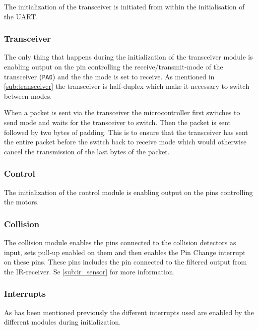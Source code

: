 \documentclass[a4paper,twoside,titlepage]{article}
\begin{document}
The initialization of the transceiver is initiated from within the initialisation of the UART.

\subsubsection{Transceiver} %
\label{ssub:transceiver}

The only thing that happens during the initialization of the transceiver module is enabling output on the pin controlling the receive/transmit-mode of the transceiver ({\tt PA0}) and the the mode is set to receive. As mentioned in \autoref{sub:transceiver} the transceiver is half-duplex which make it necessary to switch between modes.

When a packet is sent via the transceiver the microcontroller first switches to send mode and waits for the transceiver to switch. Then the packet is sent followed by two bytes of padding. This is to ensure that the transceiver has sent the entire packet before the switch back to receive mode which would otherwise cancel the transmission of the last bytes of the packet.

\subsubsection{Control} %
\label{ssub:control}

The initialization of the control module is enabling output on the pins controlling the motors.

\subsubsection{Collision} %
\label{ssub:collision}

The collision module enables the pins connected to the collision detectors as input, sets pull-up enabled on them and then enables the Pin Change interrupt on these pins. These pins includes the pin connected to the filtered output from the IR-receiver. Se \autoref{sub:ir_sensor} for more information.

\subsubsection{Interrupts} %
\label{ssub:interrupts}

As has been mentioned previously the different interrupts used are enabled by the different modules during initialization.
\end{document}
